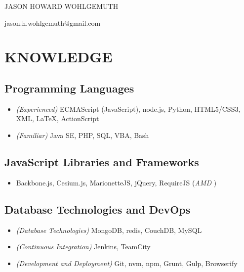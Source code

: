\documentclass[10pt]{article}
\begin{document}
\begin{center}\Huge {JASON HOWARD WOHLGEMUTH}\end{center}
\begin{center}jason.h.wohlgemuth@gmail.com\end{center}

\section{KNOWLEDGE}\label{knowledge}

\subsection{Programming Languages}\label{programming-languages}

\begin{itemize}
\itemsep1pt\parskip0pt
\item
  \emph{(Experienced)} ECMAScript (JavaScript), node.js, Python,
  HTML5/CSS3, XML, LaTeX, ActionScript
\item
  \emph{(Familiar)} Java SE, PHP, SQL, VBA, Bash
\end{itemize}

\subsection{JavaScript Libraries and
Frameworks}\label{javascript-libraries-and-frameworks}

\begin{itemize}
\itemsep1pt\parskip0pt
\item
  Backbone.js, Cesium.js, MarionetteJS, jQuery, RequireJS (\emph{AMD })
\end{itemize}

\subsection{Database Technologies and
DevOps}\label{database-technologies-and-devops}

\begin{itemize}
\itemsep1pt\parskip0pt
\item
  \emph{(Database Technologies)} MongoDB, redis, CouchDB, MySQL
\item
  \emph{(Continuous Integration)} Jenkins, TeamCity
\item
  \emph{(Development and Deployment)} Git, nvm, npm, Grunt, Gulp,
  Browserify
\end{itemize}
\end{document}
